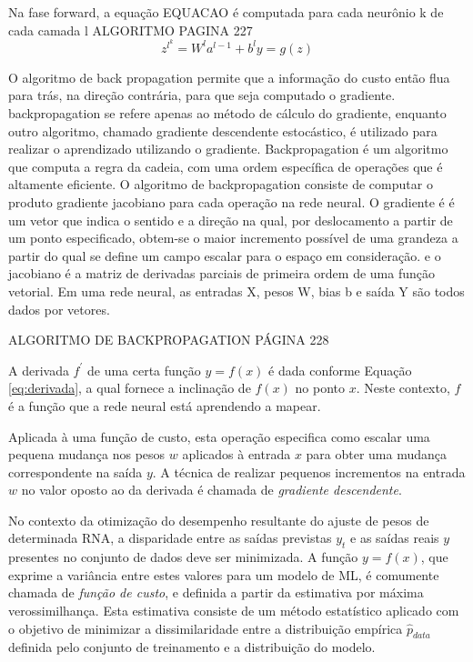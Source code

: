 Na fase forward, a equação EQUACAO é computada para cada neurônio k de cada camada l
ALGORITMO PAGINA 227
\begin{equation}
	z^l^k = W^l a^{l-1} + b^l
	y = g(z)
\end{equation}

O algoritmo de back propagation permite que a informação do custo então flua para trás, na direção contrária, para que seja computado o gradiente. backpropagation se refere apenas ao método de cálculo do gradiente, enquanto outro algoritmo, chamado gradiente descendente estocástico, é utilizado para realizar o aprendizado utilizando o gradiente.
Backpropagation é um algoritmo que computa a regra da cadeia, com uma ordem específica de operações que é altamente eficiente. O algoritmo de backpropagation consiste de computar o produto gradiente jacobiano para cada operação na rede neural. O gradiente é é um vetor que indica o sentido e a direção na qual, por deslocamento a partir de um ponto especificado, obtem-se o maior incremento possível de uma grandeza a partir do qual se define um campo escalar para o espaço em consideração.
e o jacobiano é a matriz de derivadas parciais de primeira ordem de uma função vetorial. Em uma rede neural, as entradas X, pesos W, bias b e saída Y são todos dados por vetores.

ALGORITMO DE BACKPROPAGATION PÁGINA 228


A derivada $f^\prime$ de uma certa função $y = f(x)$ é dada conforme Equação \ref{eq:derivada}, a qual fornece a inclinação de $f(x)$ no ponto $x$. Neste contexto, $f$ é a função que a rede neural está aprendendo a mapear.

Aplicada à uma função de custo, esta operação especifica como escalar uma pequena mudança nos pesos $w$ aplicados à entrada $x$ para obter uma mudança correspondente na saída $y$. A técnica de realizar pequenos incrementos na entrada $w$ no valor oposto ao da derivada é chamada de \emph{gradiente descendente}. 

No contexto da otimização do desempenho resultante do ajuste de pesos de determinada RNA, a disparidade entre as saídas previstas $y_t$ e as saídas reais $y$ presentes no conjunto de dados deve ser minimizada. A função $y=f(x)$, que exprime a variância entre estes valores para um modelo de ML, é comumente chamada de \emph{função de custo}, e definida a partir da estimativa por máxima verossimilhança. Esta estimativa consiste de um método estatístico aplicado com o objetivo de minimizar a dissimilaridade entre a distribuição empírica $\hat{p}_{data}$ definida pelo conjunto de treinamento e a distribuição do modelo.

